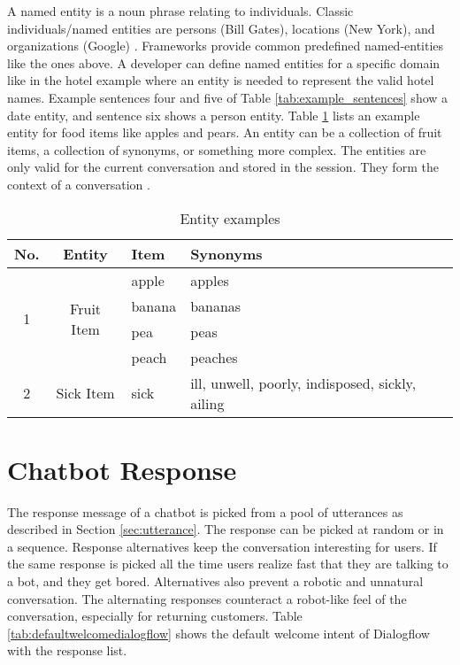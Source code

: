 A named entity is a noun phrase relating to individuals.
Classic individuals/named entities are persons (Bill Gates), locations (New York), and organizations (Google) \cite{geyer2016named}.
Frameworks provide common predefined named-entities like the ones above.
A developer can define named entities for a specific domain like in the hotel example where an entity is needed to represent the valid hotel names.
Example sentences four and five of Table \ref{tab:example_sentences} show a date entity, and sentence six shows a person entity.
Table \ref{tab:entityexampledialog} lists an example entity for food items like apples and pears.
An entity can be a collection of fruit items, a collection of synonyms, or something more complex.
The entities are only valid for the current conversation and stored in the session. 
They form the context of a conversation \cite{singhbuilding}.

\begin{table}[H]
    \centering
    \begin{tabular}{ c | c | l | l }
  No. & Entity & Item & Synonyms \\ \hline \hline
  \multirow{4}{*}{1} & \multirow{4}{*}{Fruit Item} & apple & apples \\
       & & banana & bananas\\
       & & pea & peas \\ 
       & & peach & peaches \\ \hline
    2 & Sick Item & sick & ill, unwell, poorly, indisposed, sickly, ailing \\
    \hline
\end{tabular}
    \caption{Entity examples} \label{tab:entityexampledialog}
\end{table} \noindent


\section{Chatbot Response} \label{sec:chatbot_response}
The response message of a chatbot is picked from a pool of utterances as described in Section \ref{sec:utterance}.
The response can be picked at random or in a sequence.
Response alternatives keep the conversation interesting for users.
If the same response is picked all the time users realize fast that they are 
talking to a bot, and they get bored. 
Alternatives also prevent a robotic and unnatural conversation.
The alternating responses counteract a robot-like feel of the conversation, especially for returning customers. 
Table \ref{tab:defaultwelcomedialogflow} shows the default welcome intent of Dialogflow with the response list.

